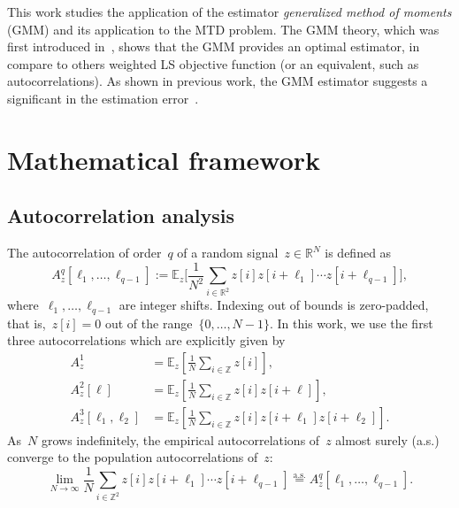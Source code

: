 \documentclass{article}
\begin{document}
This work studies the application of the estimator \textit{generalized method of moments} (GMM) and its application to the MTD problem. The GMM theory, which was first introduced in~\cite{Hansen1982},  shows that the GMM provides {an} optimal estimator, in compare to others weighted LS objective function (or an equivalent, such as autocorrelations). As shown in previous work, the GMM estimator suggests a significant in the estimation error~\cite{abas2021generalized}.

\section{Mathematical framework}
\label{sec:math}
\subsection{Autocorrelation analysis}
\label{subsec:ac}
The autocorrelation of order~$q$ of a random signal~\mbox{$z \in \mathbb{R}^{N}$} is defined as
\begin{equation}
A_z^q[\ell_1, \ldots, \ell_{q-1}] := \mathbb{E}_z\Big[\frac{1}{N^2} \sum_{i \in \mathbb{R}^2} z[i] z[i + \ell_1] \cdots z[i + \ell_{q-1}]\Big],
\end{equation}
where~$\ell_1, \ldots, \ell_{q-1}$ are integer shifts. Indexing out of bounds is zero-padded, that is,~\mbox{$z[i] = 0$} out of the range~\mbox{$\{0, \ldots, {N-1}\}$}. In this work, we use the first three autocorrelations which are explicitly given by
\begin{align}
\label{eq:ac1}
A_z^1 &= \mathbb{E}_z \left[\frac{1}{N} \sum_{i \in \mathbb{Z}} z\left[i\right] \right], \\
\label{eq:ac2}
A_z^2\left[\ell\right] &= \mathbb{E}_z \left[\frac{1}{N} \sum_{i \in \mathbb{Z}} z\left[i\right] z\left[i + \ell\right] \right], \\
\label{eq:ac3}
A_z^3\left[\ell_1, \ell_2\right] &= \mathbb{E}_z \left[\frac{1}{N} \sum_{i \in \mathbb{Z}} z\left[i\right] z\left[i + \ell_1\right] z\left[i + \ell_2\right] \right].
\end{align}
As~$N$ grows indefinitely, the empirical autocorrelations of~$z$ almost surely (a.s.) converge to the population autocorrelations of~$z$:
\begin{equation}
\lim_{N \rightarrow \infty} \frac{1}{N} \sum_{i \in \mathbb{Z}^2} z[i] z[i + \ell_1] \cdots z[i + \ell_{q-1}] \stackrel{\text{a.s.}}{=}A_z^q[\ell_1, \ldots, \ell_{q-1}].
\end{equation}
\end{document}
